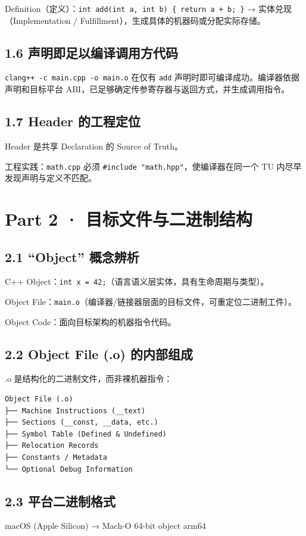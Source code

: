 \documentclass[11pt,a4paper]{article}
\begin{document}
Definition（定义）：\texttt{int add(int a, int b) \{ return a + b; \}} → 实体兑现（Implementation / Fulfillment），生成具体的机器码或分配实际存储。

\subsection{1.6 声明即足以编译调用方代码}
\texttt{clang++ -c main.cpp -o main.o} 在仅有 \texttt{add} 声明时即可编译成功。编译器依据声明和目标平台 ABI，已足够确定传参寄存器与返回方式，并生成调用指令。

\subsection{1.7 Header 的工程定位}
Header 是共享 Declaration 的 Source of Truth。

工程实践：\texttt{math.cpp} 必须 \texttt{\#include "math.hpp"}，使编译器在同一个 TU 内尽早发现声明与定义不匹配。

\section{Part 2 · 目标文件与二进制结构}
\subsection{2.1 “Object” 概念辨析}
C++ Object：\texttt{int x = 42;}（语言语义层实体，具有生命周期与类型）。

Object File：\texttt{main.o}（编译器/链接器层面的目标文件，可重定位二进制工件）。

Object Code：面向目标架构的机器指令代码。

\subsection{2.2 Object File (.o) 的内部组成}
.o 是结构化的二进制文件，而非裸机器指令：

\begin{lstlisting}[language=text]
Object File (.o)
├── Machine Instructions (__text)
├── Sections (__const, __data, etc.)
├── Symbol Table (Defined & Undefined)
├── Relocation Records
├── Constants / Metadata
└── Optional Debug Information
\end{lstlisting}
\subsection{2.3 平台二进制格式}
macOS (Apple Silicon) → Mach-O 64-bit object arm64
\end{document}
